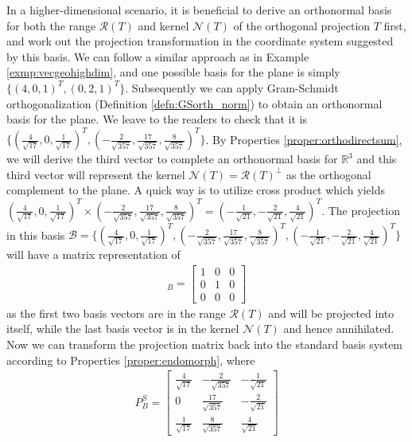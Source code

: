\begin{solution}
In a higher-dimensional scenario, it is beneficial to derive an orthonormal basis for both the range $\mathcal{R}(T)$ and kernel $\mathcal{N}(T)$ of the orthogonal projection $T$ first, and work out the projection transformation in the coordinate system suggested by this basis. We can follow a similar approach as in Example \ref{exmp:vecgeohighdim}, and one possible basis for the plane is simply $\{(4,0,1)^T, (0,2,1)^T\}$. Subsequently we can apply Gram-Schmidt orthogonalization (Definition \ref{defn:GSorth_norm}) to obtain an orthonormal basis for the plane. We leave to the readers to check that it is $\{(\frac{4}{\sqrt{17}}, 0, \frac{1}{\sqrt{17}})^T, (-\frac{2}{\sqrt{357}}, \frac{17}{\sqrt{357}}, \frac{8}{\sqrt{357}})^T\}$. By Properties \ref{proper:orthodirectsum}, we will derive the third vector to complete an orthonormal basis for $\mathbb{R}^3$ and this third vector will represent the kernel $\mathcal{N}(T) = \mathcal{R}(T)^\perp$ as the orthogonal complement to the plane. A quick way is to utilize cross product which yields $(\frac{4}{\sqrt{17}}, 0, \frac{1}{\sqrt{17}})^T \times (-\frac{2}{\sqrt{357}}, \frac{17}{\sqrt{357}}, \frac{8}{\sqrt{357}})^T = (-\frac{1}{\sqrt{21}}, -\frac{2}{\sqrt{21}}, \frac{4}{\sqrt{21}})^T$. The projection in this basis $\mathcal{B} = \{(\frac{4}{\sqrt{17}}, 0, \frac{1}{\sqrt{17}})^T, (-\frac{2}{\sqrt{357}}, \frac{17}{\sqrt{357}}, \frac{8}{\sqrt{357}})^T, (-\frac{1}{\sqrt{21}}, -\frac{2}{\sqrt{21}}, \frac{4}{\sqrt{21}})^T\}$ will have a matrix representation of
\begin{align*}
[T]_B = 
\begin{bmatrix}
1 & 0 & 0 \\
0 & 1 & 0 \\
0 & 0 & 0
\end{bmatrix}
\end{align*}
as the first two basis vectors are in the range $\mathcal{R}(T)$ and will be projected into itself, while the last basis vector is in the kernel $\mathcal{N}(T)$ and hence annihilated. Now we can transform the projection matrix back into the standard basis system according to Properties \ref{proper:endomorph}, where
\begin{align*}
P_B^S = 
\begin{bmatrix}
\frac{4}{\sqrt{17}} & -\frac{2}{\sqrt{357}} & -\frac{1}{\sqrt{21}} \\
0 & \frac{17}{\sqrt{357}} & -\frac{2}{\sqrt{21}} \\
\frac{1}{\sqrt{17}} & \frac{8}{\sqrt{357}} & \frac{4}{\sqrt{21}}

\end{bmatrix}
\end{align*}
\end{solution}
